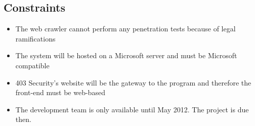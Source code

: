\subsection{Constraints}
\begin{itemize}
    \item The web crawler cannot perform any penetration tests because of legal ramifications
    \item The system will be hosted on a Microsoft server and must be Microsoft compatible
    \item 403 Security's website will be the gateway to the program and therefore the front-end must be web-based
    \item The development team is only available until May 2012.  The project is due then.
\end{itemize}

